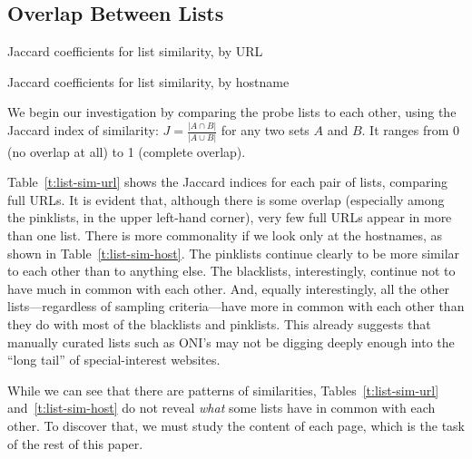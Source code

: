 \subsection{Overlap Between Lists}

\begin{table*}
\caption{Jaccard coefficients for list similarity, by URL}
\label{t:list-sim-url}
\centering\sffamily\relax
\end{table*}

\begin{table*}
\caption{Jaccard coefficients for list similarity, by hostname}
\label{t:list-sim-host}
\centering\sffamily\relax
\end{table*}

We begin our investigation by comparing the probe lists to each other,
using the Jaccard index of similarity: \hbox{$J=\frac{\lvert A\cap
  B\rvert}{\lvert A\cup B\rvert}$} for any two sets $A$ and $B$.  It
ranges from 0 (no overlap at all) to 1 (complete overlap).

Table~\ref{t:list-sim-url} shows the Jaccard indices for each pair of
lists, comparing full URLs.  It is evident that, although there is
some overlap (especially among the pinklists, in the upper left-hand
corner), very few full URLs appear in more than one list.  There is
more commonality if we look only at the hostnames, as shown in
Table~\ref{t:list-sim-host}.  The pinklists continue clearly to be
more similar to each other than to anything else.  The blacklists,
interestingly, continue not to have much in common with each other.
And, equally interestingly, all the other lists---regardless of
sampling criteria---have more in common with each other than they do
with most of the blacklists and pinklists.  This already suggests that
manually curated lists such as ONI's may not be digging deeply enough
into the “long tail” of special-interest websites.

While we can see that there are patterns of similarities,
Tables~\ref{t:list-sim-url} and~\ref{t:list-sim-host} do not reveal
\emph{what} some lists have in common with each other.  To discover
that, we must study the content of each page, which is the task of the
rest of this paper.
